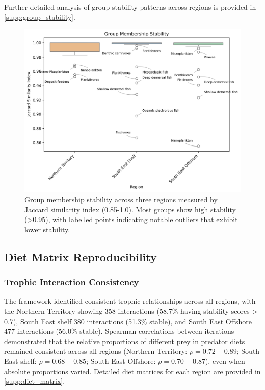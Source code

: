 Further detailed analysis of group stability patterns across regions is provided in \ref{supp:group_stability}. 

\begin{figure}[htbp]
    \centering
    \includegraphics[width=\textwidth]{figures/regional_group_analysis.png}
    \caption{Group membership stability across three regions measured by Jaccard similarity index (0.85-1.0). Most groups show high stability (>0.95), with labelled points indicating notable outliers that exhibit lower stability.}
    \label{fig:regional_analysis}
\end{figure}



\subsection{Diet Matrix Reproducibility}

\subsubsection{Trophic Interaction Consistency}
The framework identified consistent trophic relationships across all regions, with the Northern Territory showing 358 interactions (58.7\% having stability scores > 0.7), South East shelf 380 interactions (51.3\% stable), and South East Offshore 477 interactions (56.0\% stable). Spearman correlations between iterations demonstrated that the relative proportions of different prey in predator diets remained consistent across all regions (Northern Territory: $\rho = 0.72-0.89$; South East shelf: $\rho = 0.68-0.85$; South East Offshore: $\rho = 0.70-0.87$), even when absolute proportions varied. Detailed diet matrices for each region are provided in \ref{supp:diet_matrix}.

